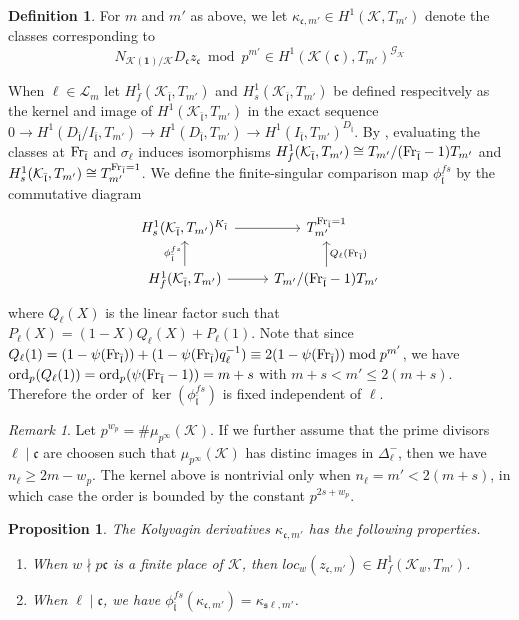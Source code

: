 \documentclass[leqno]{amsart}
\newtheorem{prop}[thm]{Proposition}
\theoremstyle{definition}
\newtheorem{defn}[thm]{Definition}
\theoremstyle{remark}
\newtheorem{rem}[thm]{Remark}
\newcommand{\id}{\mathbf{1}}
\DeclareMathOperator{\Gal}{\mathcal{G}}
\newcommand{\Fr}{\textnormal{Fr}} %
\newcommand{\fc}{\mathfrak{c}}
\newcommand{\fl}{\mathfrak{l}}
\newcommand{\fs}{\mathfrak{s}}
\newcommand{\K}{{\mathcal{K}}} %
\newcommand{\flw}{\bar{\fl}}
\newcommand{\rk}[1]{\K({#1})} %
\newcommand{\ord}{\textnormal{ord}} %
\begin{document}
\begin{defn}
For $m$ and  $m'$ as above, 
we let $\kappa_{\fc,m'}\in H^1(\K,T_{m'})$
denote the classes corresponding to 
\[
	N_{\rk{\id}/\K}D_{\fc}z_{\fc}
	\bmod p^{m'} \in 
	H^1(\rk{\fc}, T_{m'})^{\Gal_\K}
\]
\end{defn}
When $\ell\in \mathcal{L}_m$
let $H^1_f(\K_{\flw},T_{m'})$ and
$H^1_s(\K_{\flw},T_{m'})$ be defined respecitvely
as the kernel and image of $H^1(\K_{\flw},T_{m'})$ 
in the exact sequence 
$0\to H^1(D_{\flw}/I_{\flw},T_{m'})
\to H^1(D_{\flw},T_{m'})
\to H^1(I_{\flw},T_{m'})^{D_{\flw}}$.
By \cite[Lem 1.4.7]{Rubin},
evaluating the classes at
$\Fr_{\flw}$ and $\sigma_\ell$ induces isomorphisms
$H^1_f(\K_{\flw},T_{m'})\cong T_{m'}/(\Fr_{\flw}-1)T_{m'}$
and
$H^1_s(\K_{\flw},T_{m'})\cong T_{m'}^{\Fr_{\flw}=1}$.
We define the finite-singular comparison map
$\phi_{\flw}^{fs}$ by the commutative diagram
\[
	\begin{tikzcd}
		H^1_s(\K_{\flw}, T_{m'})^{K_{\flw}} \arrow[r]&
		T_{m'}^{\Fr_{\flw}=1}\\
		H^1_{f}(\K_{\flw}, T_{m'}) \arrow[r]
		\arrow[u,"\phi_{\flw}^{fs}"]&
		T_{m'}/(\Fr_{\flw}-1)T_{m'}
		\arrow[u,"Q_\ell(\Fr_{\flw})",swap]
	\end{tikzcd}
\]
where $Q_\ell(X)$ is the linear factor  such that 
$P_\ell(X)=(1-X)Q_\ell(X)+P_\ell(1)$.
Note that since
$Q_\ell(1)=
(1-\psi(\Fr_{\flw}))+(1-\psi(\Fr_{\flw})q_\ell^{-1})
\equiv 2(1-\psi(\Fr_{\flw})) \bmod p^{m'}$,
we have $\ord_p(Q_\ell(1))=\ord_p(\psi(\Fr_{\flw}-1))
=m+s$ with 
$m+s< m'\leq 2(m+s)$.
Therefore
the order of $\ker(\phi_{\flw}^{fs})$
is fixed independent of $\ell$.
\begin{rem}
Let $p^{w_p}=\#\mu_{p^\infty}(\K)$.
If we further assume that the prime divisors
$\ell\mid\fc$ are choosen such that
$\mu_{p^\infty}(\K)$ has distinc images in $\Delta_\ell^-$,
then we have  $n_\ell\geq 2m-w_p$.
The kernel above is nontrivial only when 
$n_\ell=m'<2(m+s)$, in which case the order 
is bounded by the constant $p^{2s+w_p}$.
\end{rem}


\begin{prop}
The Kolyvagin derivatives
$\kappa_{\fc,m'}$ has the following properties.
\begin{enumerate}[label=(\alph*)]
\item When $w\nmid p\fc$ is a finite place of  $\K$,
then  $loc_w(z_{\fc,m'})\in H^1_f(\K_w,T_{m'})$.
\item When $\ell\mid\fc$, we have
$\phi_{\flw}^{fs}(\kappa_{\fc,m'})=\kappa_{\fs\ell,m'}$.
\end{enumerate}
\end{prop}
\end{document}

